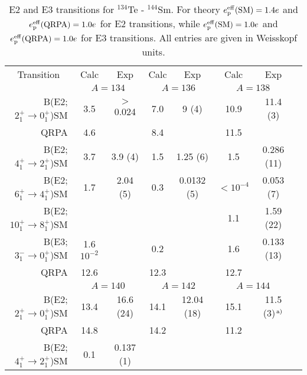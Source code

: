 \begin{table}[htbp]
\begin{center}
\caption{E2 and E3 transitions for $^{134}$Te - $^{144}$Sm. For theory 
$e_{\rm p}^{\rm eff}({\rm SM}) = 1.4e$ and 
$e_{\rm p}^{\rm eff}({\rm QRPA}) = 1.0e$ for E2 transitions, while
$e_{\rm p}^{\rm eff}({\rm SM}) = 1.0e$ and 
$e_{\rm p}^{\rm eff}({\rm QRPA}) = 1.0e$ for E3 transitions. 
All entries are given in 
Weisskopf units.}
\begin{tabular}{rccccccc}
\hline
\multicolumn{1}{c}{Transition} & Calc & Exp & Calc & Exp & Calc & Exp \\
\multicolumn{1}{c}{ } & \multicolumn{2}{c}{$A=134$} &
\multicolumn{2}{c}{$A=136$} & \multicolumn{2}{c}{$A=138$} \\
\hline
B(E2;$2^{+}_{1} \rightarrow 0^{+}_{1}$)\hspace{1.cm}SM & 3.5 & $>$ 0.024 & 7.0 & 
                                  9 (4) & 10.9 & 11.4 (3) \\ 
                               QRPA & 4.6 &    & 8.4 &   & 11.5 &  \\
B(E2;$4^{+}_{1} \rightarrow 2^{+}_{1}$)\hspace{1.cm}SM & 3.7 & 3.9 (4)  & 1.5 & 
                                  1.25 (6) & 1.5 & 0.286 (11) \\
B(E2;$6^{+}_{1} \rightarrow 4^{+}_{1}$)\hspace{1.cm}SM & 1.7 & 2.04 (5) & 0.3 & 
                                  0.0132 (5) & $< 10^{-4}$ & 0.053 (7) \\
B(E2;$10^{+}_{1} \rightarrow 8^{+}_{1}$)\hspace{.85cm}SM & & & & & 1.1 & 1.59 (22) \\
B(E3;$3^{-}_{1} \rightarrow 0^{+}_{1}$)\hspace{1.cm}SM & 1.6 $10^{-2}$ & & 0.2 & &
                                  1.6 & 0.133 (13) \\
                               QRPA & 12.6 & & 12.3 & & 12.7 & \\
\hline
\multicolumn{1}{c}{ } & \multicolumn{2}{c}{$A=140$} &
\multicolumn{2}{c}{$A=142$} & \multicolumn{2}{c}{$A=144$} \\
\hline
B(E2;$2^{+}_{1} \rightarrow 0^{+}_{1}$)\hspace{1.cm}SM & 13.4 & 16.6 (24) & 14.1 & 
        12.04 (18) & 15.1 & 11.5 (3)$^{\,{\rm a})}$ \\
                           QRPA & 14.8 &  & 14.2 &   & 11.2 &     \\
B(E2;$4^{+}_{1} \rightarrow 2^{+}_{1}$)\hspace{1.cm}SM & 0.1 & 0.137 (1) & & & & \\

\end{tabular}
\end{center}
\end{table}
